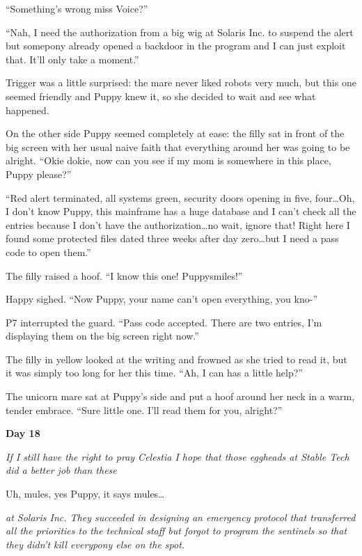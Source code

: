 ``Something's wrong miss Voice?''

``Nah, I need the authorization from a big wig at Solaris Inc. to suspend the alert but somepony already opened a backdoor in the program and I can just exploit that. It'll only take a moment.''

Trigger was a little surprised: the mare never liked robots very much, but this one seemed friendly and Puppy knew it, so she decided to wait and see what happened.

On the other side Puppy seemed completely at ease: the filly sat in front of the big screen with her usual naive faith that everything around her was going to be alright. ``Okie dokie, now can you see if my mom is somewhere in this place, Puppy please?''

``Red alert terminated, all systems green, security doors opening in five, four\dots Oh, I don't know Puppy, this mainframe has a huge database and I can't check all the entries because I don't have the authorization\dots no wait, ignore that! Right here I found some protected files dated three weeks after day zero\dots but I need a pass code to open them.''

The filly raised a hoof. ``I know this one! Puppysmiles!''

Happy sighed. ``Now Puppy, your name can't open everything, you kno-''

P7 interrupted the guard. ``Pass code accepted. There are two entries, I'm displaying them on the big screen right now.''

The filly in yellow looked at the writing and frowned as she tried to read it, but it was simply too long for her this time. ``Ah, I can has a little help?''

The unicorn mare sat at Puppy's side and put a hoof around her neck in a warm, tender embrace. ``Sure little one. I'll read them for you, alright?''

\medskip

\begin{center}
\textbf{Day 18}    
\end{center}

\emph{If I still have the right to pray Celestia I hope that those eggheads at Stable Tech did a better job than these} 

\medskip

Uh, mules, yes Puppy, it says mules\dots

\medskip

\emph{at Solaris Inc. They succeeded in designing an emergency protocol that transferred all the priorities to the technical staff but forgot to program the sentinels so that they didn't kill everypony else on the spot.}

